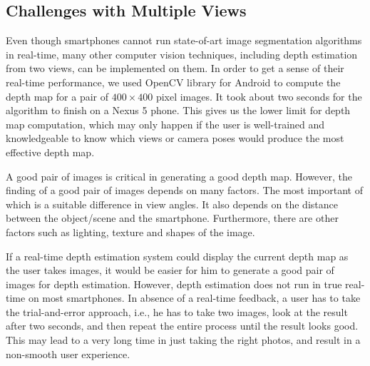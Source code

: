 
\subsection{Challenges with Multiple Views}

Even though smartphones cannot run state-of-art image segmentation algorithms in real-time, many other computer vision techniques, including depth estimation from two views, can be implemented on them. In order to get a sense of their real-time performance, we used OpenCV library for Android to compute the depth map for a pair of $400 \times 400$ pixel images. It took about two seconds for the algorithm to finish on a Nexus 5 phone. This gives us the lower limit for depth map computation, which may only happen if the user is well-trained and knowledgeable to know which views or camera poses would produce the most effective depth map.


A good pair of images is critical in generating a good depth map. However, the finding of a good pair of images depends on many factors. The most important of which is a suitable difference in view angles. It also depends on the distance between the object/scene and the smartphone. Furthermore, there are other factors such as lighting, texture and shapes of the image.

If a real-time depth estimation system could display the current depth map as the user takes images, it would be easier for him to generate a good pair of images for depth estimation. However, depth estimation does not run in true real-time on most smartphones. In absence of a real-time feedback, a user has to take the trial-and-error approach, i.e., he has to take two images, look at the result after two seconds, and then repeat the entire process until the result looks good. This may lead to a very long time in just taking the right photos, and result in a non-smooth user experience.

